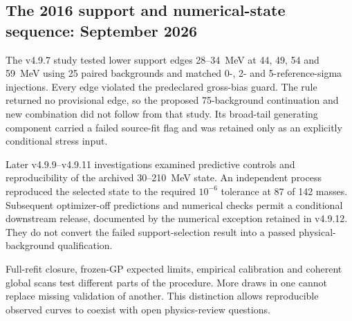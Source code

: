 \subsection{The 2016 support and numerical-state sequence: September 2026}
The v4.9.7 study tested lower support edges 28--34~MeV at 44, 49, 54 and
59~MeV using 25 paired backgrounds and matched 0-, 2- and 5-reference-sigma
injections. Every edge violated the predeclared gross-bias guard. The rule
returned no provisional edge, so the proposed 75-background continuation and
new combination did not follow from that study. Its broad-tail generating
component carried a failed source-fit flag and was retained only as an
explicitly conditional stress input.

Later v4.9.9--v4.9.11 investigations examined predictive controls and
reproducibility of the archived 30--210~MeV state. An independent process
reproduced the selected state to the required $10^{-6}$ tolerance at 87 of
142 masses. Subsequent optimizer-off predictions and numerical checks permit
a conditional downstream release, documented by the numerical exception
retained in v4.9.12. They do not convert the failed support-selection result
into a passed physical-background qualification.

Full-refit closure, frozen-GP expected limits, empirical \CLs{} calibration
and coherent global scans test different parts of the procedure. More draws
in one cannot replace missing validation of another. This distinction allows
reproducible observed curves to coexist with open physics-review questions.
